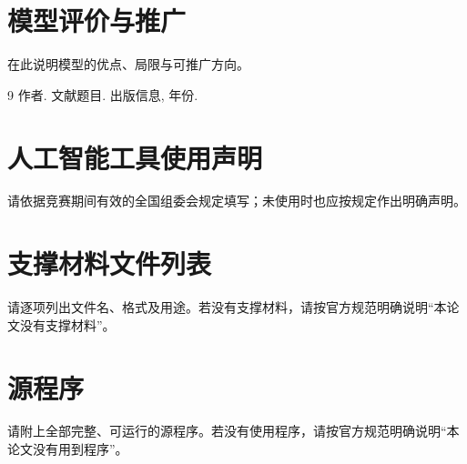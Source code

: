 \documentclass{cumcmthesis}
\begin{document}
\section{模型评价与推广}
在此说明模型的优点、局限与可推广方向。

\begin{thebibliography}{9}
    作者.
    \newblock 文献题目.
    \newblock 出版信息, 年份.
\end{thebibliography}

\section*{人工智能工具使用声明}
请依据竞赛期间有效的全国组委会规定填写；未使用时也应按规定作出明确声明。

\begin{appendices}

\section{支撑材料文件列表}
请逐项列出文件名、格式及用途。若没有支撑材料，请按官方规范明确说明“本论文没有支撑材料”。

\section{源程序}
请附上全部完整、可运行的源程序。若没有使用程序，请按官方规范明确说明“本论文没有用到程序”。

\end{appendices}
\end{document}
